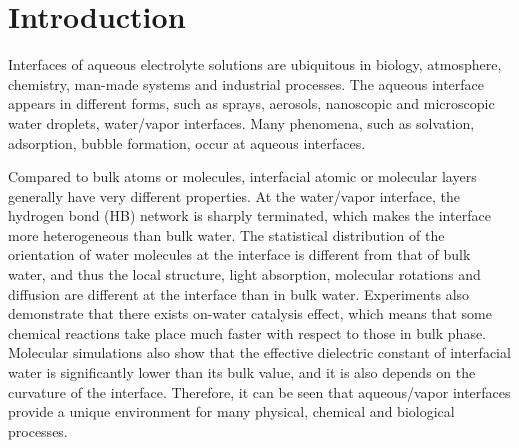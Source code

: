 \chapter{Introduction}\label{CHAPTER_1}
Interfaces of aqueous electrolyte solutions are ubiquitous in biology, atmosphere, chemistry, man-made systems 
and industrial processes\cite{Irwin88,Tobias99, Benderskii00, 
Asahi01,Benderskii02,Richmond02,LiuH2004,
TianCS08,Yamamoto2008, Salmeron2009,ZhangLY2009,
LoNostro2012,Piatkowski2014,Balajka2018}.
The aqueous interface appears in different forms, such as sprays, aerosols, nanoscopic and  microscopic water droplets, water/vapor interfaces.
Many phenomena, such as solvation\cite{Benjamin1996}, adsorption\cite{Chang06}, bubble formation\cite{Craig1993,Craig1993b,Weissenborn1995,Marcelja04,Craig04},
occur at aqueous interfaces\cite{Ball2008,Kuo2004b}. 

Compared to bulk atoms or molecules, interfacial atomic or molecular layers generally have very different properties. 
At the water/vapor interface, the hydrogen bond (HB) network is sharply terminated, which makes the interface more heterogeneous 
than bulk water\cite{singh2013}. 
The statistical distribution of the orientation of water molecules at the interface is different from that of bulk water,
and thus the local structure, light absorption,  molecular rotations and diffusion are different at the interface than in bulk water\cite{Jedlovszky2004}.
Experiments also demonstrate that there exists on-water catalysis effect, which means that some chemical reactions take place much faster 
with respect to those in bulk phase\cite{Rideout1980,Narayan2005,Beattie2010}.
Molecular simulations also show that the effective dielectric constant of interfacial water is significantly lower than its bulk value, 
and it is also depends on the curvature of the interface\cite{Dinpajooh2016}. 
Therefore, it can be seen that aqueous/vapor interfaces provide a unique environment for many physical, chemical and biological processes. 

